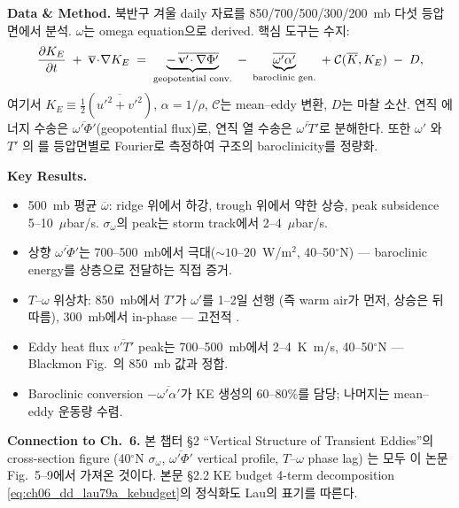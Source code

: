 \medskip
\noindent\textbf{Data \& Method.}\quad
북반구 겨울 daily 자료를 850/700/500/300/200~mb 다섯 등압면에서 분석.
$\omega$는 omega equation으로 derived.  핵심 도구는  수지:
\begin{equation}\label{eq:ch06_dd_lau79a_kebudget}
  \frac{\partial K_E}{\partial t}
  \;+\; \overline{\mathbf{v}}\!\cdot\!\nabla K_E
  \;=\; \underbrace{-\,\overline{\mathbf{v}'\!\cdot\nabla\Phi'}}_{\text{geopotential conv.}}
  \;-\;\underbrace{\overline{\omega' \alpha'}}_{\text{baroclinic gen.}}
  \;+\; \mathcal{C}(\overline{K},K_E)
  \;-\; D,
\end{equation}
여기서 $K_E \equiv \tfrac{1}{2}(\overline{u'^2 + v'^2})$, $\alpha = 1/\rho$,
$\mathcal{C}$는 mean--eddy 변환, $D$는 마찰 소산.
연직 에너지 수송은 $\overline{\omega'\Phi'}$(geopotential flux)로,
연직 열 수송은 $\overline{\omega' T'}$로 분해한다.
또한 $\omega'$ 와 $T'$ 의 를 등압면별로 Fourier로 측정하여
구조의 baroclinicity를 정량화.

\medskip
\noindent\textbf{Key Results.}
\begin{itemize}
  \item 500~mb 평균 $\overline{\omega}$: ridge 위에서 하강, trough 위에서 약한 상승,
        peak subsidence 5--10~$\mu$bar/s.  $\sigma_\omega$의 peak는 storm track에서
        2--4~$\mu$bar/s.
  \item 상향 $\overline{\omega' \Phi'}$는 700--500~mb에서 극대($\sim 10$--$20$~W/m$^2$,
        40--50$^\circ$N) --- baroclinic energy를 상층으로 전달하는 직접 증거.
  \item $T$--$\omega$ 위상차: 850~mb에서 $T'$가 $\omega'$를 1--2일 선행
        (즉 warm air가 먼저, 상승은 뒤따름), 300~mb에서 in-phase ---
        고전적 .
  \item Eddy heat flux $\overline{v'T'}$ peak는 700--500~mb에서 2--4~K~m/s,
        40--50$^\circ$N --- Blackmon Fig.~의 850~mb 값과 정합.
  \item Baroclinic conversion $-\overline{\omega'\alpha'}$가 KE 생성의 60--80\%를 담당;
        나머지는 mean--eddy 운동량 수렴.
\end{itemize}

\medskip
\noindent\textbf{Connection to Ch.~6.}\quad
본 챕터 \S2 ``Vertical Structure of Transient Eddies''의 cross-section figure
(40$^\circ$N $\sigma_\omega$, $\overline{\omega' \Phi'}$ vertical profile, $T$--$\omega$ phase lag)
는 모두 이 논문 Fig.~5--9에서 가져온 것이다.  본문 \S2.2 KE budget 4-term decomposition
\eqref{eq:ch06_dd_lau79a_kebudget}의 정식화도 Lau의 표기를 따른다.

